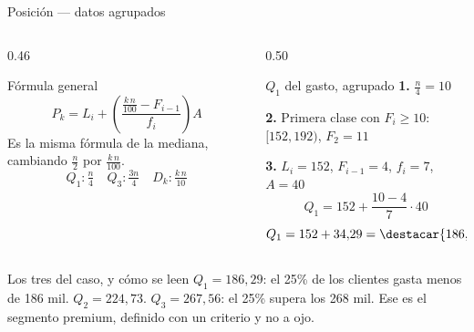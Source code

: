 \documentclass[aspectratio=169,10pt]{beamer}
\begin{document}
\begin{frame}{Posición — datos agrupados}
  \scriptsize
  \begin{columns}[T,onlytextwidth]
    \begin{column}{0.46\textwidth}
      \begin{block}{Fórmula general}
        \scriptsize
        \[ P_k = L_i + \left(\frac{\frac{k\,n}{100} - F_{i-1}}{f_i}\right) A \]
        Es la misma fórmula de la mediana, cambiando $\frac{n}{2}$ por
        $\frac{k\,n}{100}$.
        \vspace{0.1cm}
        \[ Q_1: \tfrac{n}{4} \quad Q_3: \tfrac{3n}{4} \quad
           D_k: \tfrac{k\,n}{10} \]
      \end{block}
    \end{column}
    \begin{column}{0.50\textwidth}
      \begin{exampleblock}{$Q_1$ del gasto, agrupado}
        \scriptsize
        \textbf{1.} $\frac{n}{4} = 10$

        \textbf{2.} Primera clase con $F_i \ge 10$: $[152,192)$, $F_2 = 11$

        \textbf{3.} $L_i=152$, $F_{i-1}=4$, $f_i=7$, $A=40$
        \[ Q_1 = 152 + \frac{10-4}{7}\cdot 40 \]
        \[ Q_1 = 152 + 34{,}29 = \destacar{186{,}29} \]
      \end{exampleblock}
    \end{column}
  \end{columns}

  \vspace{0.1cm}
  \begin{alertblock}{Los tres del caso, y cómo se leen}
    \scriptsize
    $Q_1 = 186{,}29$: el 25\% de los clientes gasta menos de 186 mil. \quad
    $Q_2 = 224{,}73$. \quad $Q_3 = 267{,}56$: el 25\%  supera los 268 mil. Ese es el segmento premium, definido con un
    criterio y no a ojo.
  \end{alertblock}
\end{frame}
\end{document}
